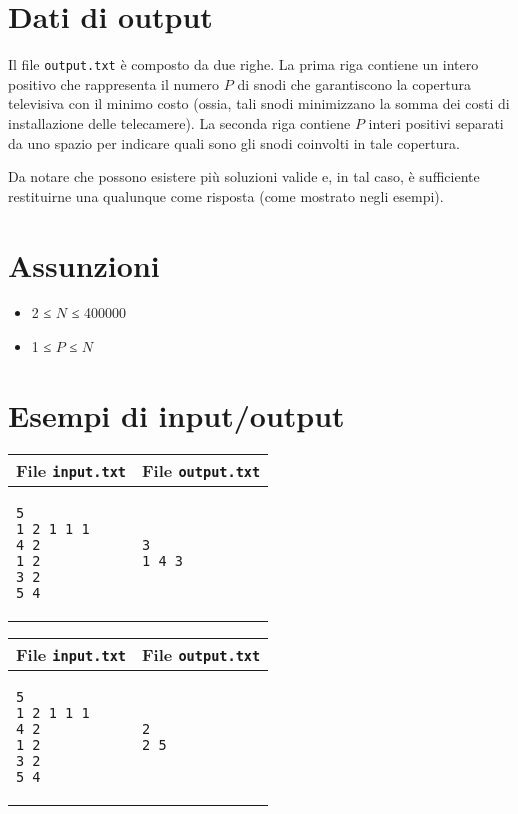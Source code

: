 \documentclass[a4paper,11pt]{article}
\begin{document}
\section*{Dati di output}
  Il file \texttt{output.txt} è composto da due righe.
La prima riga contiene un intero positivo che rappresenta il numero
$P$ di snodi che garantiscono la copertura televisiva con il
minimo costo (ossia, tali snodi minimizzano la somma dei costi di
installazione delle telecamere).
La seconda riga contiene $P$
interi positivi separati da uno spazio per indicare quali sono gli snodi
coinvolti in tale copertura.

Da notare che possono esistere più soluzioni valide e, in tal
caso, è sufficiente restituirne una qualunque come risposta
(come mostrato negli esempi).

  \section*{Assunzioni}
  \begin{itemize}
  
    \item  2 ≤ $N$ ≤ 400000
    \item  1 ≤ $P$ ≤ $N$
  \end{itemize}

\section*{Esempi di input/output}

  
    \noindent
    \begin{tabular}{p{11cm}|p{5cm}}
    \toprule
    \textbf{File \texttt{input.txt}}
    & \textbf{File \texttt{output.txt}}
    \\
    \midrule
    \scriptsize
    \begin{verbatim}
5
1 2 1 1 1
4 2
1 2
3 2
5 4
\end{verbatim}
    &
    \scriptsize
    \begin{verbatim}
3
1 4 3 
\end{verbatim}
    \\
    \bottomrule
    \end{tabular}
  
    \noindent
    \begin{tabular}{p{11cm}|p{5cm}}
    \toprule
    \textbf{File \texttt{input.txt}}
    & \textbf{File \texttt{output.txt}}
    \\
    \midrule
    \scriptsize
    \begin{verbatim}
5
1 2 1 1 1
4 2
1 2
3 2
5 4
\end{verbatim}
    &
    \scriptsize
    \begin{verbatim}
2
2 5 
\end{verbatim}
    \\
    \bottomrule
    \end{tabular}
  
\end{document}
